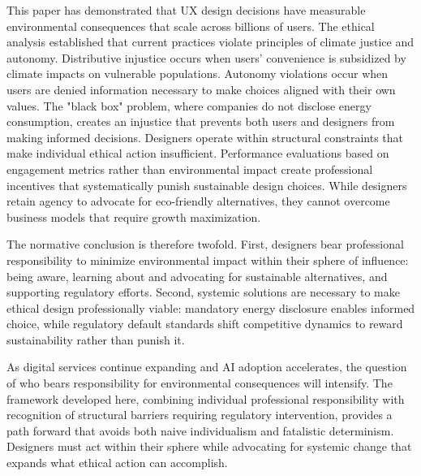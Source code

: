 This paper has demonstrated that UX design decisions have measurable environmental consequences 
that scale across billions of users. The ethical analysis established that current practices violate principles of 
climate justice and autonomy. Distributive injustice occurs when users' 
convenience is subsidized by climate impacts on vulnerable populations. Autonomy violations occur when users are denied 
information necessary to make choices aligned with their own values. The "black 
box" problem, where companies do not disclose energy consumption, creates 
an injustice that prevents both users and designers from making informed 
decisions. Designers operate within structural constraints that make individual 
ethical action insufficient. Performance evaluations based on engagement metrics 
rather than environmental impact create professional incentives that systematically 
punish sustainable design choices. While designers retain agency to advocate for 
eco-friendly alternatives, they cannot 
overcome business models that require growth maximization.

\par The normative conclusion is therefore twofold. First, designers bear professional 
responsibility to minimize environmental impact within their sphere of influence: 
being aware, learning about and advocating for sustainable alternatives, and supporting 
regulatory efforts. Second, systemic solutions are necessary to make ethical 
design professionally viable: mandatory energy disclosure enables informed choice, 
while regulatory default standards shift competitive dynamics to reward 
sustainability rather than punish it.

\par As digital services continue expanding and AI adoption accelerates, the question 
of who bears responsibility for environmental consequences will intensify. The 
framework developed here, combining individual professional responsibility with 
recognition of structural barriers requiring regulatory intervention, provides a 
path forward that avoids both naive individualism and fatalistic determinism. 
Designers must act within their sphere while advocating for systemic change that 
expands what ethical action can accomplish.